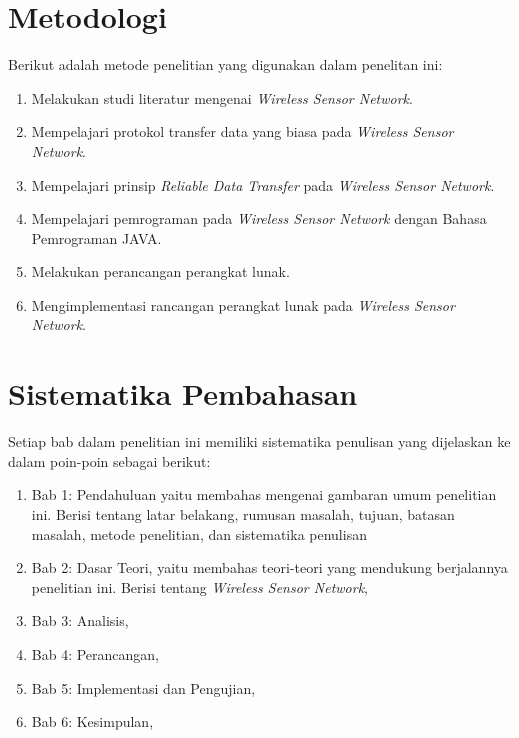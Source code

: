 \section{Metodologi}
\label{sec:metlit}
Berikut adalah metode penelitian yang digunakan dalam penelitan ini:
\begin{enumerate}
	\item Melakukan studi literatur mengenai \textit{Wireless Sensor Network}.
	\item Mempelajari protokol transfer data yang biasa pada \textit{Wireless Sensor Network}.
	\item Mempelajari prinsip \textit{Reliable Data Transfer} pada \textit{Wireless Sensor Network}.	
	\item Mempelajari pemrograman pada \textit{Wireless Sensor Network} dengan Bahasa Pemrograman JAVA.
	\item Melakukan perancangan perangkat lunak.
	\item Mengimplementasi rancangan perangkat lunak pada \textit{Wireless Sensor Network}.
\end{enumerate}


\section{Sistematika Pembahasan}
\label{sec:sispem}
Setiap bab dalam penelitian ini memiliki sistematika penulisan yang dijelaskan ke dalam poin-poin sebagai berikut:

\begin{enumerate}
	\item Bab 1: Pendahuluan yaitu membahas mengenai gambaran umum penelitian ini. Berisi tentang latar belakang, rumusan masalah, tujuan, batasan masalah, metode penelitian, dan sistematika penulisan
	\item Bab 2: Dasar Teori, yaitu membahas teori-teori yang mendukung berjalannya penelitian ini. Berisi tentang \textit{Wireless Sensor Network},
	\item Bab 3: Analisis,
	\item Bab 4: Perancangan,
	\item Bab 5: Implementasi dan Pengujian,
	\item Bab 6: Kesimpulan,
\end{enumerate}
	